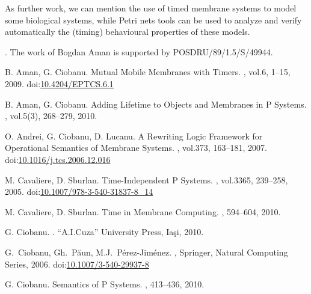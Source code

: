 \documentclass{eptcs}
\begin{document}
As further work, we can mention the use of timed membrane systems to model
some biological systems, while Petri nets tools can be used to analyze and verify
automatically the (timing) behavioural properties of these models.

\medskip

. The work of Bogdan Aman is
supported by POSDRU/89/1.5/S/49944.



\begin{thebibliography}{1}

\providecommand{\urlalt}[2]{\href{#1}{#2}}
\providecommand{\doi}[1]{doi:\urlalt{http://dx.doi.org/#1}{#1}}

B. Aman, G. Ciobanu.
\newblock Mutual Mobile Membranes with Timers.
, vol.6, 1--15, 2009.
\newblock \doi{10.4204/EPTCS.6.1}

B. Aman, G. Ciobanu.
\newblock Adding Lifetime to Objects and Membranes in P Systems.
, vol.5(3), 268--279, 2010.

O. Andrei, G. Ciobanu, D. Lucanu.
\newblock A Rewriting Logic Framework for Operational Semantics of Membrane
Systems.
, vol.373, 163--181, 2007.
\newblock \doi{10.1016/j.tcs.2006.12.016}

M. Cavaliere, D. Sburlan.
\newblock Time-Independent P Systems.
, vol.3365, 239--258, 2005.
\newblock \doi{10.1007/978-3-540-31837-8\_14}

M. Cavaliere, D. Sburlan.
\newblock Time in Membrane Computing.
, 594--604,
2010.

G. Ciobanu.
.
\newblock ``A.I.Cuza'' University Press, Ia\c si, 2010.

G.~Ciobanu, Gh.~P\u aun, M.J.~P\'erez-Jim\'enez.
, Springer, Natural
Computing Series, 2006.
\newblock \doi{10.1007/3-540-29937-8}

G. Ciobanu.
\newblock Semantics of P Systems.
, 413--436, 2010.


\end{thebibliography}
\end{document}
